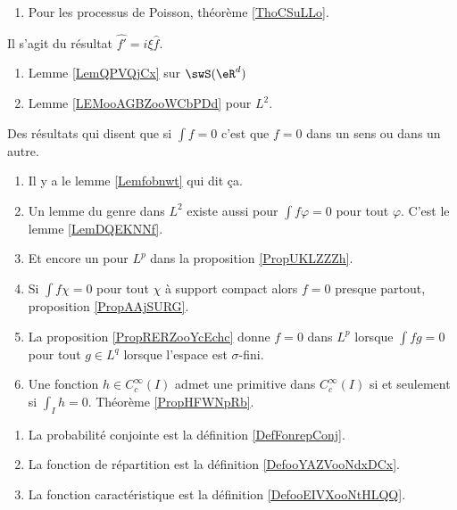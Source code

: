 \begin{enumerate}
    \item
        Pour les processus de Poisson, théorème \ref{ThoCSuLLo}.
\end{enumerate}

      \label{THEMEooJREIooKEdMOl}
Il s'agit du résultat \( \hat{f'}=i\xi \hat{f}\).
\begin{enumerate}
    \item
        Lemme \ref{LemQPVQjCx} sur \( \swS(\eR^d)\)
    \item
        Lemme \ref{LEMooAGBZooWCbPDd} pour \( L^2\).
\end{enumerate}

Des résultats qui disent que si \( \int f=0\) c'est que \( f=0\) dans un sens ou dans un autre.
\begin{enumerate}
    \item
        Il y a le lemme \ref{Lemfobnwt} qui dit ça.
    \item
        Un lemme du genre dans \( L^2\) existe aussi pour \( \int f\varphi=0\) pour tout \( \varphi\). C'est le lemme \ref{LemDQEKNNf}.
    \item
        Et encore un pour \( L^p\) dans la proposition \ref{PropUKLZZZh}.
    \item
        Si \( \int f\chi=0\) pour tout \( \chi\) à support compact alors \( f=0\) presque partout, proposition \ref{PropAAjSURG}.
    \item
        La proposition \ref{PropRERZooYcEchc} donne \( f=0\) dans \( L^p\) lorsque \( \int fg=0\) pour tout \( g\in L^q\) lorsque l'espace est \( \sigma\)-fini.
    \item
        Une fonction \( h\in C^{\infty}_c(I)\) admet une primitive dans \(  C^{\infty}_c(I)\) si et seulement si \( \int_Ih=0\). Théorème \ref{PropHFWNpRb}.
\end{enumerate}

\begin{enumerate}
    \item
        La probabilité conjointe est la définition \ref{DefFonrepConj}.
    \item
        La fonction de répartition est la définition \ref{DefooYAZVooNdxDCx}.
    \item
        La fonction caractéristique est la définition \ref{DefooEIVXooNtHLQQ}.
\end{enumerate}


